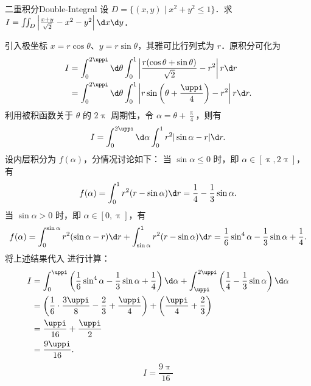 \begin{problem}{二重积分}{Double-Integral}
    设 $D = \{(x, y) \mid x^2 + y^2 \leqslant 1\}$．求 $I = \iint_D \left| \frac{x+y}{\sqrt{2}} - x^2 - y^2 \right| \d x \d y$．
\end{problem}

\begin{solution}
    引入极坐标 $x = r \cos \theta$、$y = r \sin \theta$，其雅可比行列式为 $r$．原积分可化为
    \begin{equation}
        \begin{aligned}
            I & = \int_0^{2\uppi} \d \theta \int_0^1 \left| \frac{r(\cos \theta + \sin \theta)}{\sqrt{2}} - r^2 \right| r \d r   \\
              & = \int_0^{2\uppi} \d \theta \int_0^1 \left| r \sin \left( \theta + \frac{\uppi}{4} \right) - r^2 \right| r \d r.
        \end{aligned}
    \end{equation}
    利用被积函数关于 $\theta$ 的 $2\uppi$ 周期性，令 $\alpha = \theta + \frac{\uppi}{4}$，则有
    \begin{equation}
        I = \int_0^{2\uppi} \d \alpha \int_0^1 r^2 |\sin \alpha - r| \d r. \label{eq:Integral-Form-2}
    \end{equation}
    设内层积分为 $f(\alpha)$，分情况讨论如下：
    当 $\sin \alpha \leqslant 0$ 时，即 $\alpha \in [\uppi, 2\uppi]$，有
    \begin{equation}
        f(\alpha) = \int_0^1 r^2 (r - \sin \alpha) \d r = \frac{1}{4} - \frac{1}{3} \sin \alpha.
    \end{equation}
    当 $\sin \alpha > 0$ 时，即 $\alpha \in [0, \uppi]$，有
    \begin{equation}
        f(\alpha) = \int_0^{\sin \alpha} r^2 (\sin \alpha - r) \d r + \int_{\sin \alpha}^1 r^2 (r - \sin \alpha) \d r = \frac{1}{6} \sin^4 \alpha - \frac{1}{3} \sin \alpha + \frac{1}{4}.
    \end{equation}
    将上述结果代入  进行计算：
    \begin{equation}
        \begin{aligned}
            I & = \int_0^{\uppi} \left( \frac{1}{6} \sin^4 \alpha - \frac{1}{3} \sin \alpha + \frac{1}{4} \right) \d \alpha + \int_{\uppi}^{2\uppi} \left( \frac{1}{4} - \frac{1}{3} \sin \alpha \right) \d \alpha \\
              & = \left( \frac{1}{6} \cdot \frac{3\uppi}{8} - \frac{2}{3} + \frac{\uppi}{4} \right) + \left( \frac{\uppi}{4} + \frac{2}{3} \right)                                                                 \\
              & = \frac{\uppi}{16} + \frac{\uppi}{2}                                                                                                                                                               \\
              & = \frac{9\uppi}{16}.
        \end{aligned}
    \end{equation}
    \begin{equation}
        \boxed{I = \frac{9\uppi}{16}}
    \end{equation}
\end{solution}

